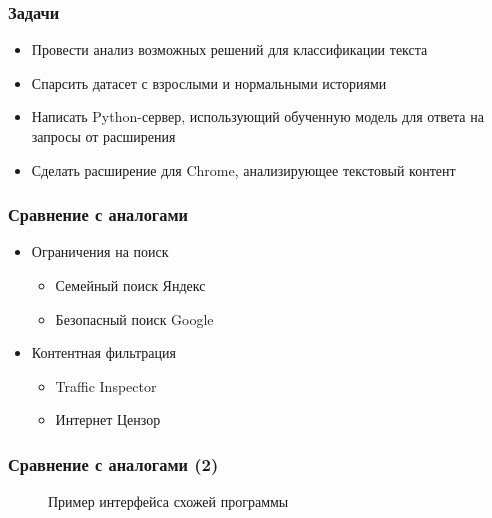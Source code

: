 \documentclass[xetex,mathserif,serif]{beamer}
\begin{document}
	\begin{frame}
		\frametitle{Задачи}
			\begin{itemize}
		 		\item Провести анализ возможных решений для классификации текста
		 		\item Спарсить датасет с взрослыми и нормальными историями
		 		\item Написать Python-сервер, использующий обученную модель для ответа на запросы от расширения
		 		\item Сделать расширение для Chrome, анализирующее текстовый контент
			\end{itemize}
	\end{frame}	
	
	\begin{frame}
		\frametitle{Сравнение с аналогами}
			\begin{itemize}
				\item Ограничения на поиск
					\begin{itemize}
				    	\item Семейный поиск Яндекс
				    	\item Безопасный поиск Google
			    	\end{itemize}
			    \item Контентная фильтрация
					\begin{itemize}
				    	\item Traffic Inspector
				    	\item Интернет Цензор
			    	\end{itemize}
			\end{itemize}
	\end{frame}
	
	\begin{frame}
		\frametitle{Сравнение с аналогами (2)}
		\begin{figure}[h]
            \caption{Пример интерфейса схожей программы}
            \label{fig:image}
        \end{figure}
	\end{frame}		
\end{document}
